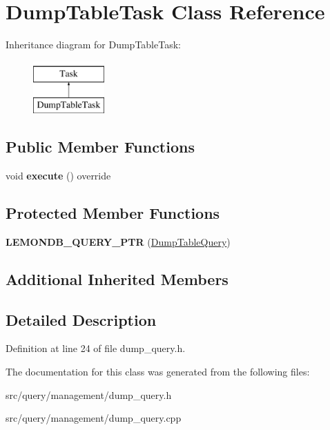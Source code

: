 \hypertarget{class_dump_table_task}{}\section{Dump\+Table\+Task Class Reference}
\label{class_dump_table_task}
Inheritance diagram for Dump\+Table\+Task\+:\begin{figure}[H]
\begin{center}
\leavevmode
\includegraphics[height=2.000000cm]{class_dump_table_task}
\end{center}
\end{figure}
\subsection*{Public Member Functions}
\begin{DoxyCompactItemize}
\item 
\mbox{\label{class_dump_table_task_a5beb6d0ee8d22ac6580077f0233b512c}} 
void {\bfseries execute} () override
\end{DoxyCompactItemize}
\subsection*{Protected Member Functions}
\begin{DoxyCompactItemize}
\item 
\mbox{\label{class_dump_table_task_abc06bc4e6393ed9cf1391ecb3c47af33}} 
{\bfseries L\+E\+M\+O\+N\+D\+B\+\_\+\+Q\+U\+E\+R\+Y\+\_\+\+P\+TR} (\hyperlink{class_dump_table_query}{Dump\+Table\+Query})
\end{DoxyCompactItemize}
\subsection*{Additional Inherited Members}


\subsection{Detailed Description}


Definition at line 24 of file dump\+\_\+query.\+h.



The documentation for this class was generated from the following files\+:\begin{DoxyCompactItemize}
\item 
src/query/management/dump\+\_\+query.\+h\item 
src/query/management/dump\+\_\+query.\+cpp\end{DoxyCompactItemize}
